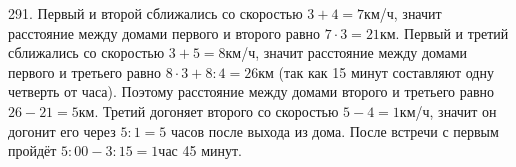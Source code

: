 291. Первый и второй сближались со скоростью $3+4=7$км/ч, значит расстояние между домами первого и второго равно $7\cdot3=21$км. Первый и третий сближались со скоростью $3+5=8$км/ч, значит расстояние между домами первого и третьего равно $8\cdot3+8:4=26$км (так как 15 минут составляют одну четверть от часа). Поэтому расстояние между домами второго и третьего равно $26-21=5$км. Третий догоняет второго со скоростью $5-4=1$км/ч, значит он догонит его через $5:1=5$ часов после выхода из дома. После встречи с первым пройдёт $5:00-3:15=1$час 45 минут.\\
